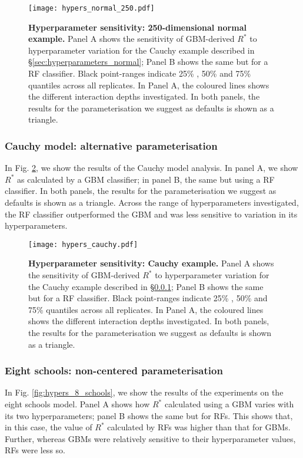 \documentclass{article}
\begin{document}
\begin{figure}[!htb]
	\centerline{\texttt{[image: hypers\_normal\_250.pdf]}}
	\caption{\textbf{Hyperparameter sensitivity: 250-dimensional normal example.} Panel A shows the sensitivity of GBM-derived $R^*$ to hyperparameter variation for the Cauchy example described in \S\ref{sec:hyperparameters_normal}; Panel B shows the same but for a RF classifier. Black point-ranges indicate 25\% , 50\% and 75\% quantiles across all replicates. In Panel A, the coloured lines shows the different interaction depths investigated. In both panels, the results for the parameterisation we suggest as defaults is shown as a triangle.}
	\label{fig:hypers_normal}
\end{figure}


\subsubsection{Cauchy model: alternative parameterisation}\label{sec:hyperparameters_cauchy}
In Fig. \ref{fig:hypers_cauchy}, we show the results of the Cauchy model analysis. In panel A, we show $R^*$ as calculated by a GBM classifier; in panel B, the same but using a RF classifier. In both panels, the results for the parameterisation we suggest as defaults is shown as a triangle. Across the range of hyperparameters investigated, the RF classifier outperformed the GBM and was less sensitive to variation in its hyperparameters.

\begin{figure}[!htb]
	\centerline{\texttt{[image: hypers\_cauchy.pdf]}}
	\caption{\textbf{Hyperparameter sensitivity: Cauchy example.} Panel A shows the sensitivity of GBM-derived $R^*$ to hyperparameter variation for the Cauchy example described in \S\ref{sec:hyperparameters_cauchy}; Panel B shows the same but for a RF classifier. Black point-ranges indicate 25\% , 50\% and 75\% quantiles across all replicates. In Panel A, the coloured lines shows the different interaction depths investigated. In both panels, the results for the parameterisation we suggest as defaults is shown as a triangle.}
	\label{fig:hypers_cauchy}
\end{figure}

\subsubsection{Eight schools: non-centered parameterisation}\label{sec:hyperparameters_8_schools}
In Fig. \ref{fig:hypers_8_schools}, we show the results of the experiments on the eight schools model. Panel A shows how $R^*$ calculated using a GBM varies with its two hyperparameters; panel B shows the same but for RFs. This shows that, in this case, the value of $R^*$ calculated by RFs was higher than that for GBMs. Further, whereas GBMs were relatively sensitive to their hyperparameter values, RFs were less so.
\end{document}

